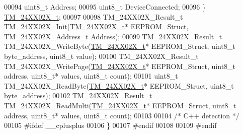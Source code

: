 \begin{DoxyCode}
00094     uint8\_t Address;
00095     uint8\_t DeviceConnected;
00096 \} \hyperlink{struct_t_m__24_x_x02_x__t}{TM\_24XX02X\_t};
00097 
00098 TM\_24XX02X\_Result\_t TM\_24XX02X\_Init(\hyperlink{struct_t_m__24_x_x02_x__t}{TM\_24XX02X\_t}* EEPROM\_Struct, TM\_24XX02X\_Address\_t Address);
00099 TM\_24XX02X\_Result\_t TM\_24XX02X\_WriteByte(\hyperlink{struct_t_m__24_x_x02_x__t}{TM\_24XX02X\_t}* EEPROM\_Struct, uint8\_t byte\_address, 
      uint8\_t value);
00100 TM\_24XX02X\_Result\_t TM\_24XX02X\_WritePage(\hyperlink{struct_t_m__24_x_x02_x__t}{TM\_24XX02X\_t}* EEPROM\_Struct, uint8\_t address, uint8\_t*
       values, uint8\_t count);
00101 uint8\_t TM\_24XX02X\_ReadByte(\hyperlink{struct_t_m__24_x_x02_x__t}{TM\_24XX02X\_t}* EEPROM\_Struct, uint8\_t byte\_address);
00102 TM\_24XX02X\_Result\_t TM\_24XX02X\_ReadMulti(\hyperlink{struct_t_m__24_x_x02_x__t}{TM\_24XX02X\_t}* EEPROM\_Struct, uint8\_t address, uint8\_t*
       values, uint8\_t count);
00103 
00104 \textcolor{comment}{/* C++ detection */}
00105 \textcolor{preprocessor}{#ifdef \_\_cplusplus}
00106 \}
00107 \textcolor{preprocessor}{#endif}
00108 
00109 \textcolor{preprocessor}{#endif}
\end{DoxyCode}
